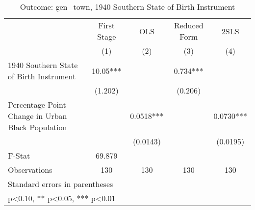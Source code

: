 \begin{table}[htbp]\centering
\def\sym#1{\ifmmode^{#1}\else\(^{#1}\)\fi}
\caption{Outcome: gen\_town, 1940 Southern State of Birth Instrument}
\begin{tabular}{l*{4}{c}}
\toprule
                    & First Stage   &         OLS   &Reduced Form   &        2SLS   \\
                    &\multicolumn{1}{c}{(1)}   &\multicolumn{1}{c}{(2)}   &\multicolumn{1}{c}{(3)}   &\multicolumn{1}{c}{(4)}   \\
\midrule
1940 Southern State of Birth Instrument&       10.05***&               &       0.734***&               \\
                    &     (1.202)   &               &     (0.206)   &               \\
\addlinespace
Percentage Point Change in Urban Black Population&               &      0.0518***&               &      0.0730***\\
                    &               &    (0.0143)   &               &    (0.0195)   \\
\midrule
F-Stat              &      69.879   &               &               &               \\
Observations        &         130   &         130   &         130   &         130   \\
\bottomrule
\multicolumn{5}{l}{\footnotesize Standard errors in parentheses}\\
\multicolumn{5}{l}{\footnotesize * p<0.10, ** p<0.05, *** p<0.01}\\
\end{tabular}
\end{table}
